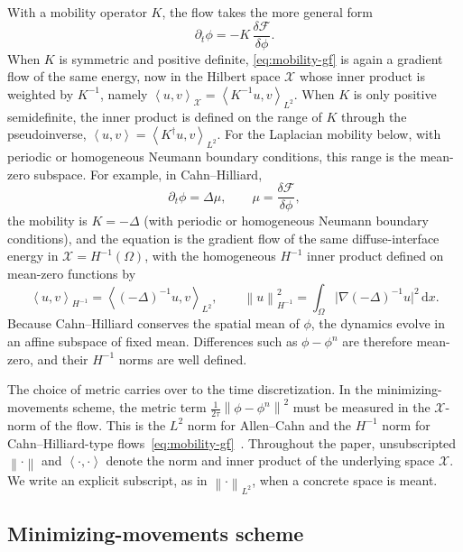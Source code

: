 \documentclass[11pt,letterpaper]{article}
\theoremstyle{plain}
\theoremstyle{definition}
\newcommand{\grad}{\nabla}%
\newcommand{\norm}[1]{\left\| #1 \right\|}
\newcommand{\E}{\mathcal{F}}
\newcommand{\X}{\mathcal{X}}
\newcommand{\dd}{\mathrm{d}}
\newcommand{\ip}[2]{\left\langle #1,#2\right\rangle}
\begin{document}
With a mobility operator \(K\), the flow takes the more general form
\begin{equation}
\partial_t \phi = -K\,\frac{\delta \E}{\delta \phi}.
\label{eq:mobility-gf}
\end{equation}
When \(K\) is symmetric and positive definite, \eqref{eq:mobility-gf} is again a gradient flow of the same energy, now in the Hilbert space \(\X\) whose inner product is weighted by \(K^{-1}\), namely \(\ip{u}{v}_{\X}=\ip{K^{-1}u}{v}_{L^2}\). When \(K\) is only positive semidefinite, the inner product is defined on the range of \(K\) through the pseudoinverse, \(\ip{u}{v}=\ip{K^{\dagger}u}{v}_{L^2}\). For the Laplacian mobility below, with periodic or homogeneous Neumann boundary conditions, this range is the mean-zero subspace. For example, in Cahn--Hilliard,
\[
\partial_t \phi = \Delta \mu,
\qquad
\mu = \frac{\delta \E}{\delta \phi},
\]
the mobility is \(K=-\Delta\) (with periodic or homogeneous Neumann boundary conditions), and the equation is the gradient flow of the same diffuse-interface energy in \(\X=H^{-1}(\Omega)\), with the homogeneous \(H^{-1}\) inner product defined on mean-zero functions by
\[
\ip{u}{v}_{H^{-1}} = \ip{(-\Delta)^{-1}u}{v}_{L^2},
\qquad
\norm{u}_{H^{-1}}^2 = \int_\Omega \bigl|\grad(-\Delta)^{-1}u\bigr|^2\,\dd x.
\]
Because Cahn--Hilliard conserves the spatial mean of \(\phi\), the dynamics evolve in an affine subspace of fixed mean. Differences such as \(\phi-\phi^n\) are therefore mean-zero, and their \(H^{-1}\) norms are well defined.

The choice of metric carries over to the time discretization. In the minimizing-movements scheme, the metric term \(\frac{1}{2\tau}\norm{\phi-\phi^n}^2\) must be measured in the \(\X\)-norm of the flow. This is the \(L^2\) norm for Allen--Cahn and the \(H^{-1}\) norm for Cahn--Hilliard-type flows~\eqref{eq:mobility-gf}~\cite{Ambrosio2008}. Throughout the paper, unsubscripted \(\norm{\cdot}\) and \(\ip{\cdot}{\cdot}\) denote the norm and inner product of the underlying space \(\X\). We write an explicit subscript, as in \(\norm{\cdot}_{L^2}\), when a concrete space is meant.

\subsection{Minimizing-movements scheme}
\label{subsec:minimizing-movements}
\end{document}
